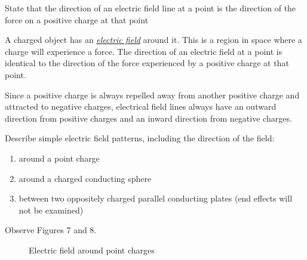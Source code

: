 \begin{subpoint}
State that the direction of an electric field line at a point is the direction of the force on a positive charge at 
that point
\end{subpoint}

A charged object has an \ul{\emph{electric field}} around it. This is a region in space where a charge will
experience a force. The direction of an electric field at a point is identical to the direction
of the force experienced by a positive charge at that point. 

Since a positive charge is always repelled away from another positive charge and attracted to
negative charges, electrical field
lines always have an outward direction from positive charges and an inward direction from negative
charges.

\begin{subpoint}
Describe simple electric field patterns, including the direction of the field:
\begin{enumerate}[label=(\alph*)]
	\setlength\itemsep{0em}
	\item around a point charge
	\item around a charged conducting sphere
	\item between two oppositely charged parallel conducting plates (end effects will not be examined)
\end{enumerate}
\end{subpoint}

Observe Figures 7 and 8.

\begin{figure}
	\centering
	 \hspace{1cm}
	\caption{Electric field around  point charges}
\end{figure}

